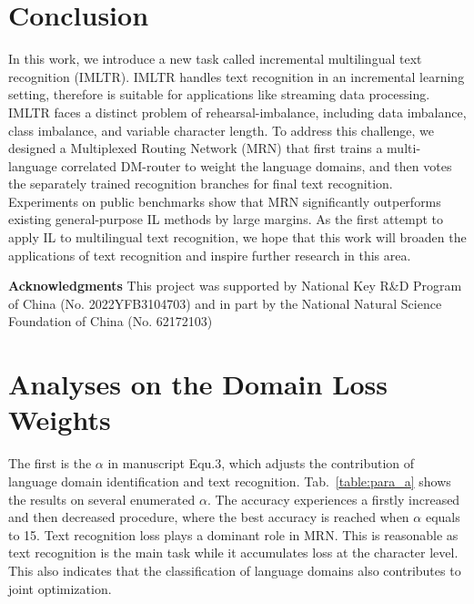 \documentclass[10pt,twocolumn,letterpaper]{article}
\begin{document}
\section{Conclusion}
In this work, we introduce a new task called incremental multilingual text recognition (IMLTR). IMLTR handles text recognition in an incremental learning setting, therefore is suitable for applications like streaming data processing. IMLTR faces a distinct problem of rehearsal-imbalance, including data imbalance, class imbalance, and variable character length. To address this challenge, we designed a Multiplexed Routing Network (MRN) that first trains a multi-language correlated DM-router to weight the language domains, and then votes the separately trained recognition branches for final text recognition. Experiments on public benchmarks show that MRN significantly outperforms existing general-purpose IL methods by large margins. As the first attempt to apply IL to multilingual text recognition, we hope that this work will broaden the applications of text recognition and inspire further research in this area.


\vspace{0.3cm}
\noindent\textbf{Acknowledgments}
This project was supported by National Key R\&D Program of China (No. 2022YFB3104703) and in part by the National Natural Science Foundation of China (No. 62172103)

{\small


}


\newpage




\ificcvfinal\thispagestyle{empty}\fi




\maketitle
\appendix


\section{Analyses on the Domain Loss Weights}
The first is the $\alpha$ in manuscript Equ.3, which adjusts the contribution of language domain identification and text recognition. Tab.~\ref{table:para_a} shows the results on several enumerated $\alpha$. The accuracy experiences a firstly increased and then decreased procedure, where the best accuracy is reached when $\alpha$ equals to 15. Text recognition loss plays a dominant role in MRN. This is reasonable as text recognition is the main task while it accumulates loss at the character level. This also indicates that the classification of language domains also contributes to joint optimization. 
\end{document}
